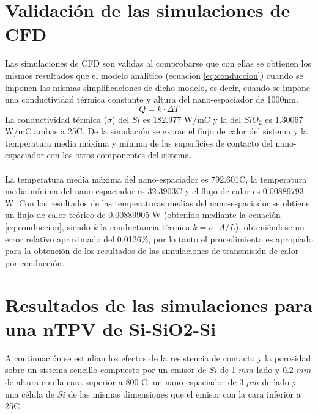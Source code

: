 \section{Validación de las simulaciones de CFD} \label{sec:val_CFD}
Las simulaciones de CFD son validas al comprobarse que con ellas se obtienen los mismos resultados que el modelo analítico (ecuación \eqref{eq:conduccion}) cuando se imponen las mismas simplificaciones de dicho modelo, es decir, cuando se impone una conductividad térmica constante y altura del nano-espaciador de 1000nm.
\begin{equation}
Q=k\cdot \Delta T
\label{eq:conduccion}
\end{equation}
La conductividad térmica ($\sigma$) del $Si$ es 182.977 W/m\textdegree C y la del $SiO_2$ es 1.30067 W/m\textdegree C ambas a 25\textdegree C. De la simulación se extrae el flujo de calor del sistema y la temperatura media máxima y mínima de las superficies de contacto del nano-espaciador con los otros componentes del sistema.\\\\
La temperatura media máxima del nano-espaciador es 792.601\textdegree C, la temperatura media mínima del nano-espaciador es 32.3903\textdegree C y el flujo de calor es 0.00889793 W. Con los resultados de las temperaturas medias del nano-espaciador se obtiene un flujo de calor teórico de 0.00889905 W (obtenido mediante la ecuación \eqref{eq:conduccion}, siendo $k$ la conductancia térmica $k=\sigma \cdot A/L$), obteniéndose un error relativo aproximado del 0.0126\%, por lo tanto el procedimiento es apropiado para la obtención de los resultados de las simulaciones de transmisión de calor por conducción.
\section{Resultados de las simulaciones para una nTPV de Si-SiO2-Si}\label{sec:res_SiSiO2Si}
A continuación se estudian los efectos de la resistencia de contacto y la porosidad sobre un sistema sencillo compuesto por un emisor de $Si$ de 1 $mm$ lado y 0.2 $mm$ de altura con la cara superior a 800 \textdegree C, un nano-espaciador de 3 $\mu m$ de lado y una célula de $Si$ de las mismas dimensiones que el emisor con la cara inferior a 25\textdegree C.
